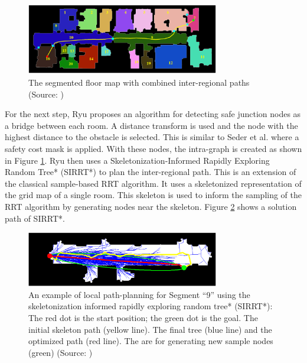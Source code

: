 \begin{figure}[h]
    \centering
    \includegraphics[width=0.75\textwidth]{figures/20_state_of_the_art/ryu_floor_path.png}
    \caption[The segmented floor map with combined inter-regional paths]{The segmented floor map with combined inter-regional paths (Source: \cite{ryu_hierarchical_2020})}
    \label{fig:ryu_floor_path}
\end{figure}

For the next step, Ryu proposes an algorithm for detecting safe junction nodes as a bridge between each room. A distance transform is used and the node with the highest distance to the obstacle is selected. This is similar to Seder et al. where a safety cost mask is applied. With these nodes, the intra-graph is created as shown in Figure \ref{fig:ryu_floor_path}. Ryu then uses a Skeletonization-Informed Rapidly Exploring Random Tree* (SIRRT*) to plan the inter-regional path. This is an extension of the classical sample-based RRT algorithm. It uses a skeletonized representation of the grid map of a single room. This skeleton is used to inform the sampling of the RRT algorithm by generating nodes near the skeleton. Figure \ref{fig:ryu_sirrt} shows a solution path of SIRRT*. 

\begin{figure}[h]
    \centering
    \includegraphics[width=0.75\textwidth]{figures/20_state_of_the_art/ryu_sirrt.png}
    \caption[Path planning with the SIRRT*]{An example of local path-planning for Segment “9” using the skeletonization informed rapidly exploring random tree* (SIRRT*): The red dot is the start position; the green dot is the goal. The initial skeleton path (yellow line). The final tree (blue line) and the optimized path (red line). The are for generating new sample nodes (green) (Source: \cite{ryu_hierarchical_2020})}
    \label{fig:ryu_sirrt}
\end{figure}

